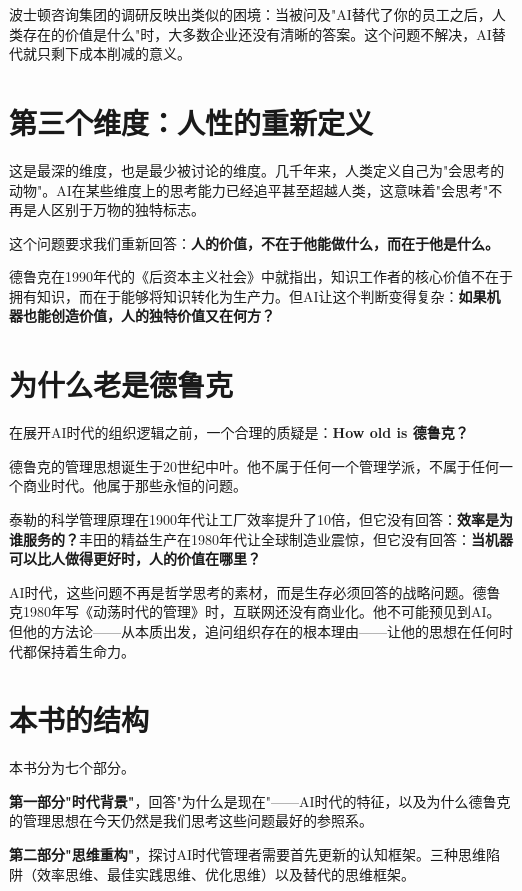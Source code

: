 波士顿咨询集团的调研反映出类似的困境：当被问及"AI替代了你的员工之后，人类存在的价值是什么"时，大多数企业还没有清晰的答案。这个问题不解决，AI替代就只剩下成本削减的意义。

\section{第三个维度：人性的重新定义}


这是最深的维度，也是最少被讨论的维度。几千年来，人类定义自己为"会思考的动物"。AI在某些维度上的思考能力已经追平甚至超越人类，这意味着"会思考"不再是人区别于万物的独特标志。

这个问题要求我们重新回答：\textbf{人的价值，不在于他能做什么，而在于他是什么。}

德鲁克在1990年代的《后资本主义社会》中就指出，知识工作者的核心价值不在于拥有知识，而在于能够将知识转化为生产力。但AI让这个判断变得复杂：\textbf{如果机器也能创造价值，人的独特价值又在何方？}


\section{为什么老是德鲁克}


在展开AI时代的组织逻辑之前，一个合理的质疑是：\textbf{How old is 德鲁克？}

德鲁克的管理思想诞生于20世纪中叶。他不属于任何一个管理学派，不属于任何一个商业时代。他属于那些永恒的问题。

泰勒的科学管理原理在1900年代让工厂效率提升了10倍，但它没有回答：\textbf{效率是为谁服务的？}丰田的精益生产在1980年代让全球制造业震惊，但它没有回答：\textbf{当机器可以比人做得更好时，人的价值在哪里？}

AI时代，这些问题不再是哲学思考的素材，而是生存必须回答的战略问题。德鲁克1980年写《动荡时代的管理》时，互联网还没有商业化。他不可能预见到AI。但他的方法论——从本质出发，追问组织存在的根本理由——让他的思想在任何时代都保持着生命力。


\section{本书的结构}


本书分为七个部分。

\textbf{第一部分"时代背景"}，回答"为什么是现在"——AI时代的特征，以及为什么德鲁克的管理思想在今天仍然是我们思考这些问题最好的参照系。

\textbf{第二部分"思维重构"}，探讨AI时代管理者需要首先更新的认知框架。三种思维陷阱（效率思维、最佳实践思维、优化思维）以及替代的思维框架。

